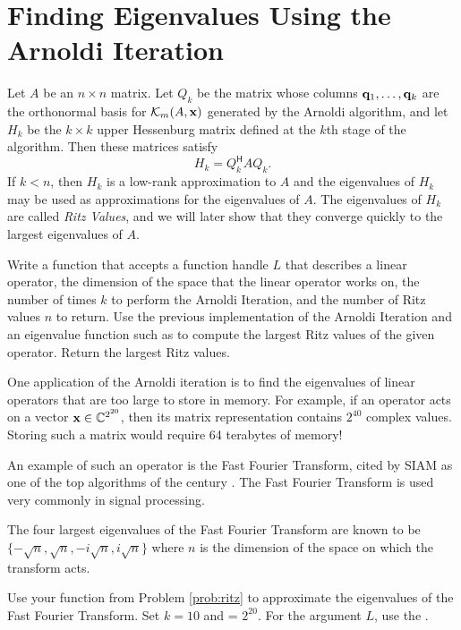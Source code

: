 \section*{Finding Eigenvalues Using the Arnoldi Iteration} %

Let $A$ be an $n \times n$ matrix.
Let $Q_k$ be the matrix whose columns $\mathbf{q}_1, \ldots, \mathbf{q}_k$ are the orthonormal basis for $\mathcal{K}_m(A, \mathbf{x})$ generated by the Arnoldi algorithm, and let $H_k$ be the $k\times k$ upper Hessenburg matrix defined at the $k$th stage of the algorithm.
Then these matrices satisfy
\begin{equation}\label{eq:arnoldi-hqa}
H_k = Q_k^{\mathsf H} A Q_k.
\end{equation}
If $k<n$, then $H_k$ is a low-rank approximation to $A$  and the eigenvalues of $H_k$ may be used as approximations for the eigenvalues of $A$.
The eigenvalues of $H_k$ are called \emph{Ritz Values}, and we will later show that they converge quickly to the largest eigenvalues of $A$.

\begin{problem}\label{prob:ritz}
Write a function that accepts a function handle $L$ that describes a linear operator, the dimension of the space  that the linear operator works on, the number of times $k$ to perform the Arnoldi Iteration, and the number of Ritz values $n$ to return.
Use the previous implementation of the Arnoldi Iteration and an eigenvalue function such as  to compute the largest Ritz values of the given operator.
Return the  largest Ritz values.
\end{problem}

One application of the Arnoldi iteration is to find the eigenvalues of linear operators that are too large to store in memory.
For example, if an operator acts on a vector $\mathbf{x} \in \mathbb{C}^{2^{20}}$, then its matrix representation contains $2^{40}$ complex values.
Storing such a matrix would require 64 terabytes of memory!

An example of such an operator is the Fast Fourier Transform, cited by SIAM as one of the top algorithms of the century \cite{cipra2000}.
The Fast Fourier Transform is used very commonly in signal processing.

\begin{problem}
\label{prob:fourier_eigs}
The four largest eigenvalues of the Fast Fourier Transform are known to be $\{ -\sqrt{n}, \sqrt{n}, -i\sqrt{n}, i\sqrt{n} \}$ where $n$ is the dimension of the space on which the transform acts.

Use your function from Problem \ref{prob:ritz} to approximate the eigenvalues of the Fast Fourier Transform.
Set $k = 10$ and  = $2^{20}$.
For the argument $L$, use the .
\end{problem}

